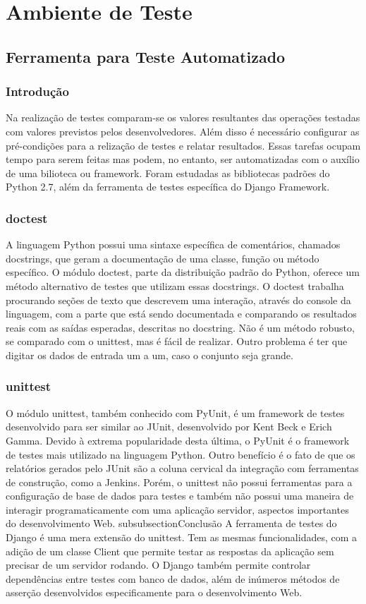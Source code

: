 \documentclass[12pt,a4paper]{article}
\begin{document}
\clearpage
\section{Ambiente de Teste}
	\subsection{Ferramenta para Teste Automatizado}
		\subsubsection{Introdução}
			Na realização de testes comparam-se os valores resultantes das
			operações testadas com valores previstos pelos desenvolvedores.
			Além disso é necessário configurar as pré-condições para a
			relização de testes e relatar resultados. Essas tarefas ocupam 
			tempo para serem feitas mas podem, no entanto, ser automatizadas
			com o auxílio de uma bilioteca ou framework.
			Foram estudadas as bibliotecas padrões do Python 2.7, além da
			ferramenta de testes específica do Django Framework.
		\subsubsection{doctest}
			A linguagem Python possui uma sintaxe específica de comentários, chamados docstrings,
			que geram a documentação de uma classe, função ou método específico.
			O módulo doctest, parte da distribuição padrão do Python, oferece um
			método alternativo de testes que utilizam essas docstrings.
			O doctest trabalha procurando seções de texto
			que descrevem uma interação, através do console da linguagem, com a parte que está
			sendo documentada e comparando os resultados reais
			com as saídas esperadas, descritas no docstring.
			Não é um método robusto, se comparado com o unittest, mas é fácil de realizar. Outro
			problema é ter que digitar os dados de entrada um a um, caso o conjunto seja grande.
		\subsubsection{unittest}
			O módulo unittest, também conhecido com PyUnit, é um framework de testes desenvolvido
			para ser similar ao JUnit, desenvolvido por Kent Beck e Erich Gamma. Devido à extrema
			popularidade desta última, o PyUnit é o framework de testes mais utilizado na linguagem
			Python. Outro benefício é o fato de que os relatórios gerados pelo JUnit são a coluna
			cervical da integração com ferramentas de construção, como a Jenkins.
			Porém, o unittest não possui ferramentas para a configuração de base de dados para testes
			e também não possui uma maneira de interagir programaticamente com uma aplicação servidor,
			aspectos importantes do desenvolvimento Web.
		subsubsection{Conclusão}
			A ferramenta de testes do Django é uma mera extensão do unittest. Tem as mesmas funcionalidades,
			com a adição de um classe Client que permite testar as respostas da aplicação sem precisar
			de um servidor rodando. O Django também permite controlar dependências entre testes com
			banco de dados, além de inúmeros métodos de asserção desenvolvidos especificamente para
			o desenvolvimento Web.
\end{document}
